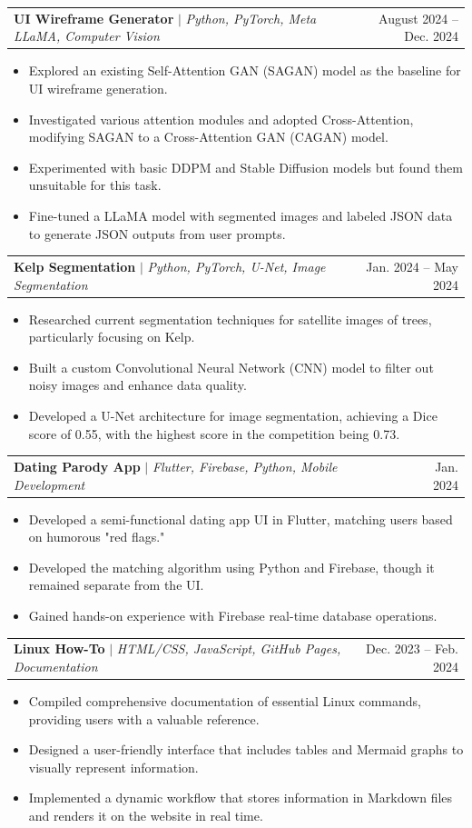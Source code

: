 \documentclass[letterpaper,11pt]{article}
\makeatletter
\newcommand{\resumeItem}[1]{\hspace{-2pt}
  \item\small{
    {#1 \vspace{-2pt}}
  }
}
\newcommand{\resumeProjectHeading}[2]{
    \item
    \hspace{-4pt}
    \begin{tabular*}{0.97\textwidth}{l@{\extracolsep{\fill}}r}
      \small#1 & #2 \\
    \end{tabular*}\vspace{-7pt}
}
\newcommand{\resumeItemListStart}{\hspace{-4pt}\begin{itemize}}
\newcommand{\resumeItemListEnd}{\end{itemize}\vspace{-5pt}}
\makeatother
\begin{document}
        \resumeProjectHeading
        {\textbf{UI Wireframe Generator} $|$ \footnotesize\emph{Python, PyTorch, Meta LLaMA, Computer Vision}}{August 2024 -- Dec. 2024}
        \resumeItemListStart
            \resumeItem{Explored an existing Self-Attention GAN (SAGAN) model as the baseline for UI wireframe generation.}
            \resumeItem{Investigated various attention modules and adopted Cross-Attention, modifying SAGAN to a Cross-Attention GAN (CAGAN) model.}
            \resumeItem{Experimented with basic DDPM and Stable Diffusion models but found them unsuitable for this task.}
            \resumeItem{Fine-tuned a LLaMA model with segmented images and labeled JSON data to generate JSON outputs from user prompts.}
        \resumeItemListEnd

        \resumeProjectHeading
        {\textbf{Kelp Segmentation} $|$ \footnotesize\emph{Python, PyTorch, U-Net, Image Segmentation}}{Jan. 2024 -- May 2024}
        \resumeItemListStart
            \resumeItem{Researched current segmentation techniques for satellite images of trees, particularly focusing on Kelp.}
            \resumeItem{Built a custom Convolutional Neural Network (CNN) model to filter out noisy images and enhance data quality.}
            \resumeItem{Developed a U-Net architecture for image segmentation, achieving a Dice score of 0.55, with the highest score in the competition being 0.73.}
        \resumeItemListEnd

        \resumeProjectHeading
        {\textbf{Dating Parody App} $|$ \footnotesize\emph{Flutter, Firebase, Python, Mobile Development}}{Jan. 2024}
        \resumeItemListStart
            \resumeItem{Developed a semi-functional dating app UI in Flutter, matching users based on humorous "red flags."}
            \resumeItem{Developed the matching algorithm using Python and Firebase, though it remained separate from the UI.}
            \resumeItem{Gained hands-on experience with Firebase real-time database operations.}
        \resumeItemListEnd
          
        \resumeProjectHeading
        {\textbf{Linux How-To} $|$ \footnotesize\emph{HTML/CSS, JavaScript, GitHub Pages, Documentation}}{Dec. 2023 -- Feb. 2024}
        \resumeItemListStart
            \resumeItem{Compiled comprehensive documentation of essential Linux commands, providing users with a valuable reference.}
            \resumeItem{Designed a user-friendly interface that includes tables and Mermaid graphs to visually represent information.}
            \resumeItem{Implemented a dynamic workflow that stores information in Markdown files and renders it on the website in real time.}
        \resumeItemListEnd
\end{document}
